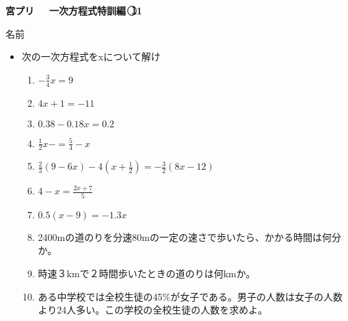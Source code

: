 \documentclass[a4paper,fleqn,papersize,15pt]{jsarticle}
\begin{document}
\clearpage
 \begin{center}
   \LARGE\textbf{宮プリ　~一次方程式特訓編~\textcircled{\scriptsize 11}}
     \begin{flushright}
       名前\underline{\hspace{8zw}}
     \end{flushright}
 \end{center}

 \begin{itemize}
   \item 次の一次方程式をxについて解け
   \begin{enumerate}
\item $- \frac{3}{4}x = 9$ \begin{flushright}\framebox[8em]{\rule{0pt}{6ex}}\end{flushright} %
\item $4x+1=-11$ \begin{flushright}\framebox[8em]{\rule{0pt}{6ex}}\end{flushright} %
\item $0.38-0.18x=0.2$ \begin{flushright}\framebox[8em]{\rule{0pt}{6ex}}\end{flushright} %
\item $\frac{1}{2} x-  = \frac{5}{4} -x$ \begin{flushright}\framebox[8em]{\rule{0pt}{6ex}}\end{flushright} %
\item $\frac{2}{3} (9-6x)-4(x+ \frac{1}{2} )=- \frac{3}{2} (8x-12)$ \begin{flushright}\framebox[8em]{\rule{0pt}{6ex}}\end{flushright} %
\item $ 4-x= \frac{2x+7}{5}$ \begin{flushright}\framebox[8em]{\rule{0pt}{6ex}}\end{flushright} %
\item $0.5(x-9)=-1.3x$ \begin{flushright}\framebox[8em]{\rule{0pt}{6ex}}\end{flushright} %
\item 2400mの道のりを分速80mの一定の速さで歩いたら、かかる時間は何分か。 \vfill \begin{flushright}\framebox[8em]{\rule{0pt}{6ex}}\end{flushright} %
\item 時速３kmで２時間歩いたときの道のりは何kmか。 \vfill \begin{flushright}\framebox[8em]{\rule{0pt}{6ex}}\end{flushright} %
\item ある中学校では全校生徒の45\%が女子である。男子の人数は女子の人数より24人多い。この学校の全校生徒の人数を求めよ。 \vfill \begin{flushright}\framebox[8em]{\rule{0pt}{6ex}}\end{flushright} %
\end{enumerate}
    \vfill
\end{itemize}
\end{document}
